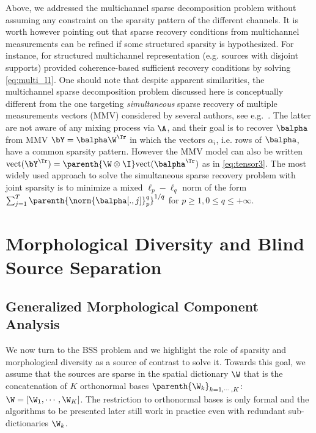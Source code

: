 Above, we addressed the multichannel sparse decomposition problem without assuming any constraint on the sparsity pattern of the different channels. It is worth however pointing out that sparse recovery conditions from multichannel measurements can be refined if some structured sparsity is hypothesized. For instance, for structured multichannel representation (e.g. sources with disjoint supports) \citet{GN05} provided coherence-based sufficient recovery conditions by solving \eqref{eq:multi_l1}. One should note that despite apparent similarities, the multichannel sparse decomposition problem discussed here is conceptually different from the one targeting \textit{simultaneous} sparse recovery of multiple measurements vectors (MMV) considered by several authors, see e.g.\ \citet{CREK05,MalioutovMMV05,TroppMMV06,ChenHuo06,ArgyriouMMVLearning08,BachMMVLearning08,GribonvalMMV08,EldarMMV08,LouniciMMVLearning09,WainwrightMMV09}. The latter are not aware of any mixing process via $\A$, and their goal is to recover $\balpha$ from MMV $\bY=\balpha\W^\Tr$ in which the vectors $\alpha_i$, i.e. rows of $\balpha$, have a common sparsity pattern. However the MMV model can also be written $\mathrm{vect}(\bY^\Tr) = \parenth{\W \otimes \I} \mathrm{vect}(\balpha^\Tr)$ as in \eqref{eq:tensor3}. The most widely used approach to solve the simultaneous sparse recovery problem with joint sparsity is to minimize a mixed $\ell_p-\ell_q$ norm of the form $\sum_{j=1}^T\parenth{\norm{\balpha[.,j]}_p^q}^{1/q}$ for $p \geq 1, 0 \leq q \leq +\infty$.


\section{Morphological Diversity and Blind Source Separation}
\subsection{Generalized Morphological Component Analysis}
\label{subsec:gmca}
We now turn to the BSS problem and we highlight the role of sparsity and morphological diversity as a source of contrast to solve it. Towards this goal, we assume that the sources are sparse in the spatial dictionary $\W$ that is the concatenation of $K$ orthonormal bases $\parenth{{\W}_{k}}_{k=1,\cdots,K}$: $\W = \left[{\W}_{1},\cdots,{\W}_{K} \right]$. The restriction to orthonormal bases is only formal and the algorithms to be presented later still work in practice even with redundant sub-dictionaries $\W_k$. 

